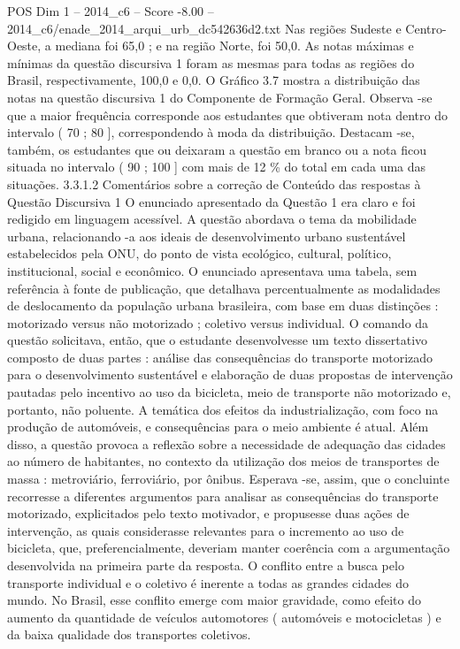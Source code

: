 \begin{textsample}{POS Dim 1 – 2014\_c6 – Score -8.00 – 2014\_c6/enade\_2014\_arqui\_urb\_dc542636d2.txt}
Nas regiões Sudeste e Centro-Oeste, a mediana foi 65,0 ; e na região Norte, foi 50,0.
As notas máximas e mínimas da questão discursiva 1 foram as mesmas para todas as regiões do Brasil, respectivamente, 100,0 e 0,0.
O Gráfico 3.7 mostra a distribuição das notas na questão discursiva 1 do Componente de Formação Geral.
Observa -se que a maior frequência corresponde aos estudantes que obtiveram nota dentro do intervalo ( 70 ; 80 ], correspondendo à moda da distribuição.
Destacam -se, também, os estudantes que ou deixaram a questão em branco ou a nota ficou situada no intervalo ( 90 ; 100 ] com mais de 12 \% do total em cada uma das situações. 3.3.1.2 Comentários sobre a correção de Conteúdo das respostas à Questão Discursiva 1 O enunciado apresentado da Questão 1 era claro e foi redigido em linguagem acessível.
A questão abordava o tema da mobilidade urbana, relacionando -a aos ideais de desenvolvimento urbano sustentável estabelecidos pela ONU, do ponto de vista ecológico, cultural, político, institucional, social e econômico.
O enunciado apresentava uma tabela, sem referência à fonte de publicação, que detalhava percentualmente as modalidades de deslocamento da população urbana brasileira, com base em duas distinções : motorizado versus não motorizado ; coletivo versus individual.
O comando da questão solicitava, então, que o estudante desenvolvesse um texto dissertativo composto de duas partes : análise das consequências do transporte motorizado para o desenvolvimento sustentável e elaboração de duas propostas de intervenção pautadas pelo incentivo ao uso da bicicleta, meio de transporte não motorizado e, portanto, não poluente.
A temática dos efeitos da industrialização, com foco na produção de automóveis, e consequências para o meio ambiente é atual.
Além disso, a questão provoca a reflexão sobre a necessidade de adequação das cidades ao número de habitantes, no contexto da utilização dos meios de transportes de massa : metroviário, ferroviário, por ônibus.
Esperava -se, assim, que o concluinte recorresse a diferentes argumentos para analisar as consequências do transporte motorizado, explicitados pelo texto motivador, e propusesse duas ações de intervenção, as quais considerasse relevantes para o incremento ao uso de bicicleta, que, preferencialmente, deveriam manter coerência com a argumentação desenvolvida na primeira parte da resposta.
O conflito entre a busca pelo transporte individual e o coletivo é inerente a todas as grandes cidades do mundo.
No Brasil, esse conflito emerge com maior gravidade, como efeito do aumento da quantidade de veículos automotores ( automóveis e motocicletas ) e da baixa qualidade dos transportes coletivos.

\end{textsample}
